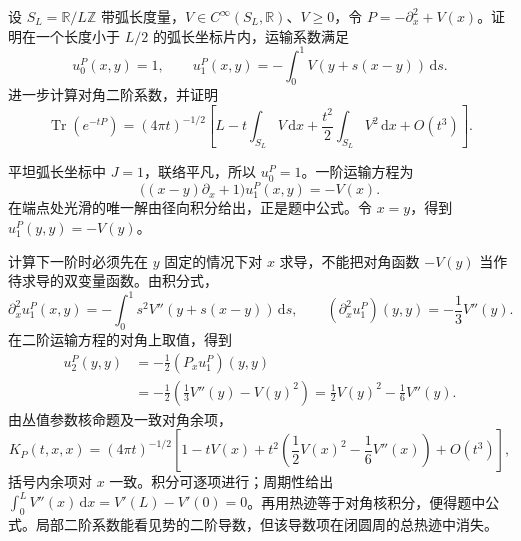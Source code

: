 \begin{exercise}\label{g3:ex:circle-variable-potential-coefficients}
	设 \(S_L=\mathbb R/L\mathbb Z\) 带弧长度量，\(V\in C^\infty(S_L,\mathbb R)\)、\(V\ge0\)，令 \(P=-\partial_x^2+V(x)\)。证明在一个长度小于 \(L/2\) 的弧长坐标片内，运输系数满足
	\[
		u_0^P(x,y)=1,\qquad
		u_1^P(x,y)=-\int_0^1V(y+s(x-y))\,\mathrm ds.
	\]
	进一步计算对角二阶系数，并证明
	\[
		\operatorname{Tr}(e^{-tP})
		=(4\pi t)^{-1/2}
		\left[
		L-t\int_{S_L}V\,\mathrm dx
		+\frac{t^2}{2}\int_{S_L}V^2\,\mathrm dx+O(t^3)
		\right].
	\]
\end{exercise}
\begin{solution}
	平坦弧长坐标中 \(J=1\)，联络平凡，所以 \(u_0^P=1\)。一阶运输方程为
	\[
		\bigl((x-y)\partial_x+1\bigr)u_1^P(x,y)=-V(x).
	\]
	在端点处光滑的唯一解由径向积分给出，正是题中公式。令 \(x=y\)，得到 \(u_1^P(y,y)=-V(y)\)。

	计算下一阶时必须先在 \(y\) 固定的情况下对 \(x\) 求导，不能把对角函数 \(-V(y)\) 当作待求导的双变量函数。由积分式，
	\[
		\partial_x^2u_1^P(x,y)
		=-\int_0^1s^2V''(y+s(x-y))\,\mathrm ds,
		\qquad
		(\partial_x^2u_1^P)(y,y)=-\frac13V''(y).
	\]
	在二阶运输方程的对角上取值，得到
	\[
		\begin{aligned}
			u_2^P(y,y)
			&=-\frac12(P_xu_1^P)(y,y)\\
			&=-\frac12\left(\frac13V''(y)-V(y)^2\right)
			=\frac12V(y)^2-\frac16V''(y).
		\end{aligned}
	\]
	由丛值参数核命题及一致对角余项，
	\[
		K_P(t,x,x)=(4\pi t)^{-1/2}
		\left[1-tV(x)+t^2\left(\frac12V(x)^2-\frac16V''(x)\right)
		+O(t^3)\right],
	\]
	括号内余项对 \(x\) 一致。积分可逐项进行；周期性给出
	\(\int_0^LV''(x)\,\mathrm dx=V'(L)-V'(0)=0\)。再用热迹等于对角核积分，便得题中公式。局部二阶系数能看见势的二阶导数，但该导数项在闭圆周的总热迹中消失。
\end{solution}

